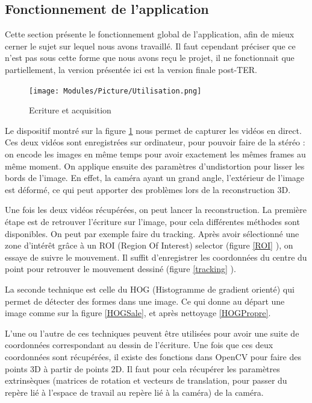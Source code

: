 \subsection{Fonctionnement de l'application}

Cette section présente le fonctionnement global de l'application, afin de mieux cerner le sujet sur lequel nous avons travaillé. Il faut cependant préciser que ce n'est pas sous cette forme que nous avons reçu le projet, il ne fonctionnait que partiellement, la version présentée ici est la version finale post-TER.

\begin{figure}[!h]
\centering
\texttt{[image: Modules/Picture/Utilisation.png]}
\caption{Ecriture et acquisition}
\label{utilisation}
\end{figure}

Le dispositif montré sur la figure \ref{utilisation} nous permet de capturer les vidéos en direct. Ces deux vidéos sont enregistrées sur ordinateur, pour pouvoir faire de la stéréo : on encode les images en même temps pour avoir exactement les mêmes frames au même moment. On applique ensuite des paramètres d'undistortion pour lisser les bords de l'image. En effet, la caméra ayant un grand angle, l'extérieur de l'image est déformé, ce qui peut apporter des problèmes lors de la reconstruction 3D.

Une fois les deux vidéos récupérées, on peut lancer la reconstruction. La première étape est de retrouver l'écriture sur l'image, pour cela différentes méthodes sont disponibles. On peut par exemple faire du tracking. Après avoir sélectionné une zone d'intérêt grâce à un ROI (Region Of Interest) selector (figure \ref{ROI} ), on essaye de suivre le mouvement. Il suffit d'enregistrer les coordonnées du centre du point pour retrouver le mouvement dessiné (figure \ref{tracking} ).

La seconde technique est celle du HOG (Histogramme de gradient orienté) qui permet de détecter des formes dans une image. Ce qui donne au départ une image comme sur la figure \ref{HOGSale}, et après nettoyage \ref{HOGPropre}.

L'une ou l'autre de ces techniques peuvent être utilisées pour avoir une suite de coordonnées correspondant au dessin de l'écriture. Une fois que ces deux coordonnées sont récupérées, il existe des fonctions dans OpenCV pour faire des points 3D à partir de points 2D. Il faut pour cela récupérer les paramètres extrinsèques (matrices de rotation et vecteurs de translation, pour passer du repère lié à l'espace de travail au repère lié à la caméra) de la caméra.


